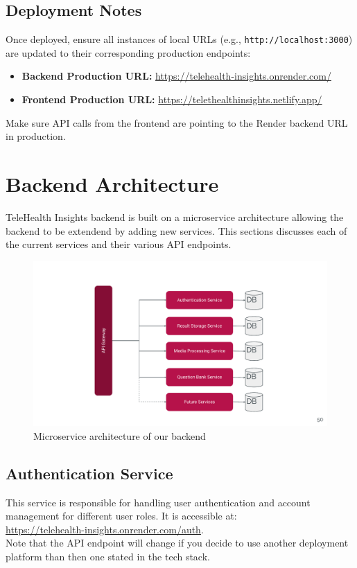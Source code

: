 \documentclass{article}
\begin{document}
\subsection{Deployment Notes}

Once deployed, ensure all instances of local URLs (e.g., \texttt{http://localhost:3000}) are updated to their corresponding production endpoints:

\begin{itemize}
    \item \textbf{Backend Production URL:} \url{https://telehealth-insights.onrender.com/}
    \item \textbf{Frontend Production URL:} \url{https://telethealthinsights.netlify.app/}
\end{itemize}

Make sure API calls from the frontend are pointing to the Render backend URL in production.


\section{Backend Architecture}
    TeleHealth Insights backend is built on a microservice architecture allowing the backend to be extendend by adding new services.
    This sections discusses each of the current services and their various API endpoints.
\begin{figure}[H]
    \centering
    \includegraphics[scale=0.5]{images/Telehealth Insights Capstone Presentation.pdf}
    \caption{Microservice architecture of our backend}
  \end{figure}

  \subsection{Authentication Service}
  This service is responsible for handling user authentication and account management 
  for different user roles. It is accessible at: \\
  \url{https://telehealth-insights.onrender.com/auth}.\\ Note that the API endpoint will change if you decide to use another deployment platform than then one stated in the tech stack.
  
\end{document}
